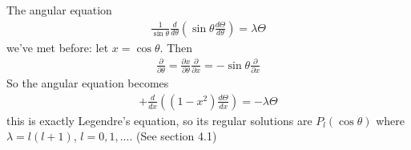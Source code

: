 \documentclass[a4paper]{article}
\begin{document}
The angular equation
\begin{equation*}
\begin{aligned}
\frac{1}{\sin\theta} \frac{d}{d\theta} \left(\sin\theta\frac{d\Theta}{d\theta}\right) = \lambda\Theta
\end{aligned}
\end{equation*}
we've met before: let $x = \cos\theta$. Then
\begin{equation*}
\begin{aligned}
\frac{\partial}{\partial \theta} = \frac{\partial x}{\partial \theta} \frac{\partial}{\partial x} = -\sin\theta\frac{\partial}{\partial x}
\end{aligned}
\end{equation*}
So the angular equation becomes
\begin{equation*}
\begin{aligned}
+\frac{d}{dx}\left(\left(1-x^2\right)\frac{d\Theta}{dx}\right) = -\lambda\Theta
\end{aligned}
\end{equation*}
this is exactly Legendre's equation, so its regular solutions are $P_l\left(\cos\theta\right)$ where $\lambda = l\left(l+1\right)$, $l=0,1,...$. (See section 4.1)
\end{document}
